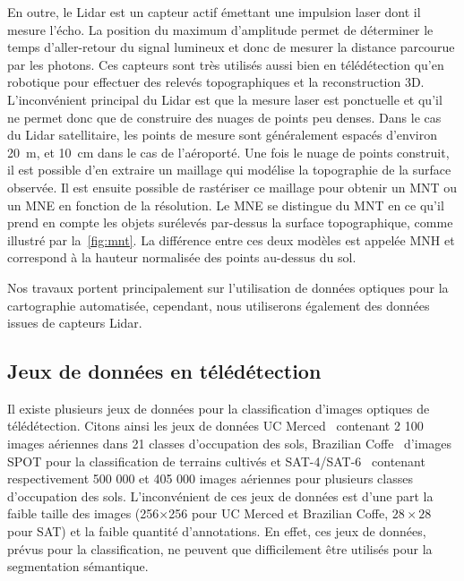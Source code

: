 En outre, le \gls{Lidar} est un capteur actif émettant une impulsion laser dont il mesure l'écho. La position du maximum d'amplitude permet de déterminer le temps d'aller-retour du signal lumineux et donc de mesurer la distance parcourue par les photons. Ces capteurs sont très utilisés aussi bien en télédétection qu'en robotique pour effectuer des relevés topographiques et la reconstruction 3D. L'inconvénient principal du \gls{Lidar} est que la mesure laser est ponctuelle et qu'il ne permet donc que de construire des nuages de points peu denses. Dans le cas du \gls{Lidar} satellitaire, les points de mesure sont généralement espacés d'environ \SI{20}{\meter}, et \SI{10}{\centi\meter} dans le cas de l'aéroporté. Une fois le nuage de points construit, il est possible d'en extraire un maillage qui modélise la topographie de la surface observée. Il est ensuite possible de rastériser ce maillage pour obtenir un \gls{MNT} ou un \gls{MNE} en fonction de la résolution. Le \gls{MNE} se distingue du \gls{MNT} en ce qu'il prend en compte les objets surélevés par-dessus la surface topographique, comme illustré par la~\cref{fig:mnt}. La différence entre ces deux modèles est appelée \gls{MNH} et correspond à la hauteur normalisée des points au-dessus du sol.

Nos travaux portent principalement sur l'utilisation de données optiques pour la cartographie automatisée, cependant, nous utiliserons également des données issues de capteurs \gls{Lidar}.

\subsection{Jeux de données en télédétection}

Il existe plusieurs jeux de données pour la classification d'images optiques de télédétection. Citons ainsi les jeux de données UC Merced~\cite{yang_bag--visual-words_2010} contenant 2 100 images aériennes dans 21 classes d'occupation des sols, Brazilian Coffe~\cite{penatti_deep_2015} d'images \gls{SPOT} pour la classification de terrains cultivés et SAT-4/SAT-6~\cite{basu_deepsat_2015} contenant respectivement 500 000 et 405 000 images aériennes pour plusieurs classes d'occupation des sols. L'inconvénient de ces jeux de données est d'une part la faible taille des images (256$\times$\SI{256}{\px} pour UC Merced et Brazilian Coffe, $28\times28$\SI{}{\px} pour SAT) et la faible quantité d'annotations. En effet, ces jeux de données, prévus pour la classification, ne peuvent que difficilement être utilisés pour la segmentation sémantique.

